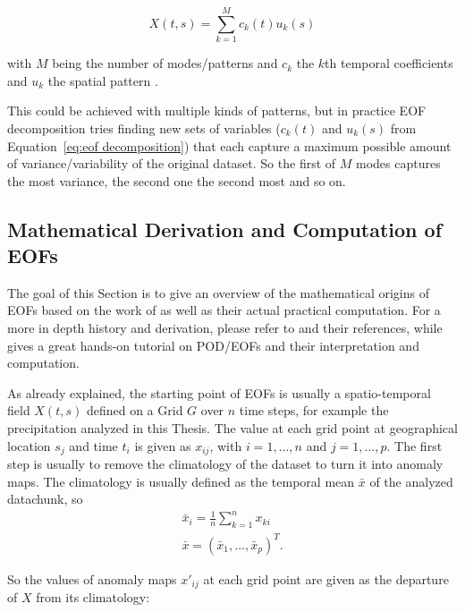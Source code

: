 \begin{equation}
  X(t, s) = \sum^{M}_{k=1} c_k(t) u_k(s)
  \label{eq:eof decomposition}
\end{equation}

with $M$ being the number of modes/patterns and  $c_k$ the $k$th temporal coefficients and $u_k$ the spatial pattern \cite{hannachi_empirical_2007}. 

This could be achieved with multiple kinds of patterns, but in practice EOF decomposition tries finding new sets of variables ($c_k(t)$ and $u_k(s)$ from Equation~\ref{eq:eof decomposition}) that each capture a maximum possible amount of variance/variability of the original dataset. 
So the first of $M$ modes captures the most variance, the second one the second most and so on. 

\subsection{Mathematical Derivation and Computation of EOFs}

The goal of this Section is to give an overview of the mathematical origins of EOFs based on the work of  as well as their actual practical computation. 
For a more in depth history and derivation, please refer to \cite{hannachi_empirical_2007} and their references, while  gives a great hands-on tutorial on POD/EOFs and their interpretation and computation. 

As already explained, the starting point of EOFs is usually a spatio-temporal field $X(t, s)$ defined on a Grid $G$ over $n$ time steps, for example the precipitation analyzed in this Thesis. 
The value at each grid point at geographical location $s_j$ and time $t_i$ is given as $x_{ij}$, with $i = 1, ..., n$  and $j = 1, ..., p$.  
The first step is usually to remove the climatology of the dataset to turn it into anomaly maps. 
The climatology is usually defined as the temporal mean $\bar{x}$ of the analyzed datachunk, so 
\begin{align}
  \bar{x}_i = \frac{1}{n} \sum^{n}_{k=1} x_{ki} \\
  \bar{x} = (\bar{x}_1, ..., \bar{x}_p)^T .
  \label{eq:climatology}
\end{align}

So the values of anomaly maps $x'_{ij}$ at each grid point are given as the departure of $X$ from its climatology: 



